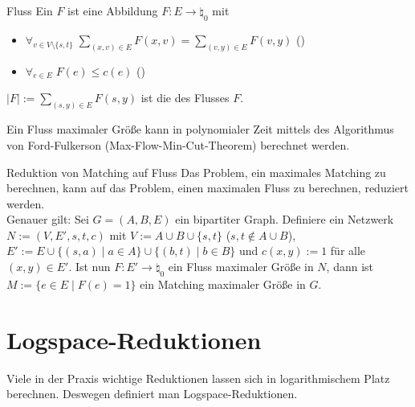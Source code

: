 \begin{Def}{Fluss}
    Ein  $F$ ist eine Abbildung $F\colon E \rightarrow \natural_0$ mit
    \begin{itemize}
        \item
        $\forall_{v \in V \setminus \{s, t\}}\;
        \sum_{(x, v) \in E} F(x, v) = \sum_{(v, y) \in E} F(v, y)$ ()

        \item
        $\forall_{e \in E}\; F(e) \le c(e)$ ()
    \end{itemize}
    $|F| := \sum_{(s, y) \in E} F(s, y)$ ist die  des Flusses $F$.
\end{Def}

\begin{Bem}
    Ein Fluss maximaler Größe kann in polynomialer Zeit mittels des
    Algorithmus von Ford-Fulkerson (Max-Flow-Min-Cut-Theorem) berechnet werden.
\end{Bem}

\linie

\begin{Satz}{Reduktion von Matching auf Fluss}
    Das Problem, ein maximales Matching zu berechnen, kann auf das Problem, einen
    maximalen Fluss zu berechnen, reduziert werden.\\
    Genauer gilt:
    Sei $G = (A, B, E)$ ein bipartiter Graph.
    Definiere ein Netzwerk $N := (V, E', s, t, c)$ mit
    $V := A \cup B \cup \{s, t\}$ ($s, t \notin A \cup B$),
    $E' := E \cup \{(s, a) \;|\; a \in A\} \cup \{(b, t) \;|\; b \in B\}$ und
    $c(x, y) := 1$ für alle $(x, y) \in E'$.
    Ist nun $F\colon E' \rightarrow \natural_0$ ein Fluss maximaler Größe in $N$,
    dann ist $M := \{e \in E \;|\; F(e) = 1\}$ ein Matching maximaler Größe in $G$.
\end{Satz}

\pagebreak

\section{%
    Logspace-Reduktionen%
}

\begin{Bem}
    Viele in der Praxis wichtige Reduktionen lassen sich in logarithmischem Platz berechnen.
    Deswegen definiert man Logspace-Reduktionen.
\end{Bem}

